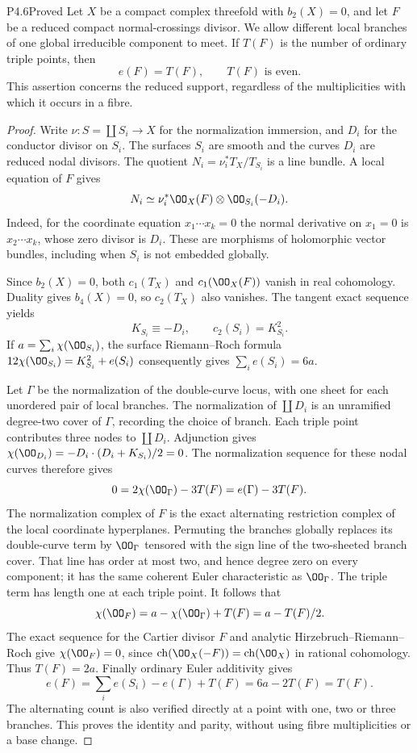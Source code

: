 \begin{statement}{P4.6}{Proved}
Let $X$ be a compact complex threefold with $b_2(X)=0$, and let $F$ be a
reduced compact normal-crossings divisor. We allow different local
branches of one global irreducible component to meet. If $T(F)$ is the
number of ordinary triple points, then
\[
 e(F)=T(F),\qquad T(F)\text{ is even}.
\]
This assertion concerns the reduced support, regardless of the
multiplicities with which it occurs in a fibre.
\end{statement}
\begin{proof}
Write $\nu:S=\coprod S_i\to X$ for the normalization immersion, and $D_i$
for the conductor divisor on $S_i$. The surfaces $S_i$ are smooth and
the curves $D_i$ are reduced nodal divisors. The quotient
$N_i=\nu_i^*T_X/T_{S_i}$ is a line bundle. A local equation of $F$ gives
\[
 N_i\simeq \nu_i^*\OO_X(F)\otimes\OO_{S_i}(-D_i).
\]
Indeed, for the coordinate equation $x_1\cdots x_k=0$ the normal
derivative on $x_1=0$ is $x_2\cdots x_k$, whose zero divisor is $D_i$.
These are morphisms of holomorphic vector bundles, including when
$S_i$ is not embedded globally.

Since $b_2(X)=0$, both $c_1(T_X)$ and $c_1(\OO_X(F))$ vanish in real
cohomology. Duality gives $b_4(X)=0$, so $c_2(T_X)$ also vanishes. The
tangent exact sequence yields
\[
 K_{S_i}\equiv-D_i,\qquad c_2(S_i)=K_{S_i}^2.
\]
If $a=\sum_i\chi(\OO_{S_i})$, the surface Riemann--Roch formula
$12\chi(\OO_{S_i})=K_{S_i}^2+e(S_i)$ consequently gives
$\sum_i e(S_i)=6a$.

Let $\Gamma$ be the normalization of the double-curve locus, with one
sheet for each unordered pair of local branches. The normalization of
$\coprod D_i$ is an unramified degree-two cover of $\Gamma$, recording
the choice of branch. Each triple point contributes three nodes to
$\coprod D_i$. Adjunction gives
$\chi(\OO_{D_i})=-D_i\cdot(D_i+K_{S_i})/2=0$. The normalization
sequence for these nodal curves therefore gives
\[
 0=2\chi(\OO_\Gamma)-3T(F)=e(\Gamma)-3T(F).
\]
The normalization complex of $F$ is the exact alternating restriction
complex of the local coordinate hyperplanes. Permuting the branches
globally replaces its double-curve term by $\OO_\Gamma$ tensored with
the sign line of the two-sheeted branch cover. That line has order at
most two, and hence degree zero on every component; it has the same
coherent Euler characteristic as $\OO_\Gamma$. The triple term has
length one at each triple point. It follows that
\[
 \chi(\OO_F)=a-\chi(\OO_\Gamma)+T(F)=a-T(F)/2.
\]
The exact sequence for the Cartier divisor $F$ and analytic
Hirzebruch--Riemann--Roch give $\chi(\OO_F)=0$, since
$\operatorname{ch}(\OO_X(-F))=\operatorname{ch}(\OO_X)$ in rational
cohomology. Thus $T(F)=2a$. Finally ordinary Euler additivity gives
\[
 e(F)=\sum_i e(S_i)-e(\Gamma)+T(F)=6a-2T(F)=T(F).
\]
The alternating count is also verified directly at a point with one,
two or three branches. This proves the identity and parity, without
using fibre multiplicities or a base change.
\end{proof}

